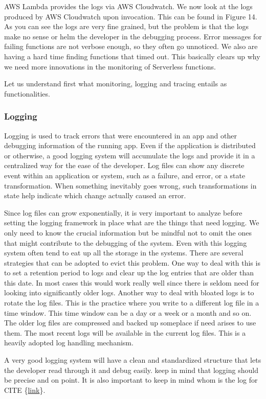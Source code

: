 \documentclass[12pt,titlepage]{article}
\begin{document}
AWS Lambda provides the logs via AWS Cloudwatch. We now look at the logs
produced by AWS Cloudwatch upon invocation. This can be found in Figure 14. As
you can see the logs are very fine grained, but the problem is that the logs
make no sense or helm the developer in the debugging process. Error messages for
failing functions are not verbose enough, so they often go unnoticed. We also are
having a hard time finding functions that timed out. This basically clears up
why we need more innovations in the monitoring of Serverless functions.

Let us understand first what monitoring, logging and tracing entails as functionalities. 
\subsubsection{Logging}
\label{sec:org6dae159}
Logging is used to track errors that were encountered in an app and other
debugging information of the running app. Even if the application is distributed
or otherwise, a good logging system will accumulate the logs and provide it in a
centralized way for the ease of the developer. Log files can show any discrete
event within an application or system, such as a failure, and error, or a state
transformation. When something inevitably goes wrong, such transformations in
state help indicate which change actually caused an error.

Since log files can grow exponentially, it is very important to analyze before
setting the logging framework in place what are the things that need logging. We
only need to know the crucial information but be mindful not to omit the ones
that might contribute to the debugging of the system. Even with this logging
system often tend to eat up all the storage in the systems. There are several
strategies that can be adopted to evict this problem. One way to deal with this
is to set a retention period to logs and clear up the log entries that are older
than this date. In most cases this would work really well since there is seldom
need for looking into significantly older logs. Another way to deal with bloated
logs is to rotate the log files. This is the practice where you write to a
different log file in a time window. This time window can be a day or a week or
a month and so on. The older log files are compressed and backed up someplace if
need arises to use them. The most recent logs will be available in the current
log files. This is a heavily adopted log handling mechanism.

A very good logging system will have a clean and standardized structure that
lets the developer read through it and debug easily. keep in mind that logging
should be precise and on point. It is also important to keep in mind whom is the
log for CITE \{\href{https://www.bmc.com/blogs/monitoring-logging-tracing/}{link}\}. 
\end{document}
